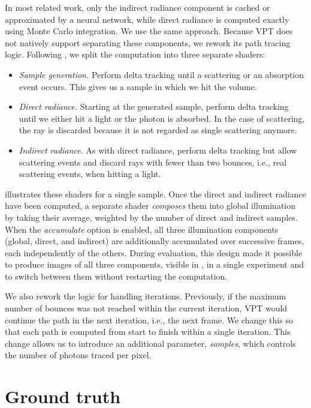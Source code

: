 In most related work, only the indirect radiance component is cached or
approximated by a neural network, while direct radiance is computed exactly using
Monte Carlo integration. We use the same approach. Because VPT does not natively 
support separating these components, we rework its path tracing logic. Following
\cite{bauer_photon_2024}, we split the computation into three separate shaders:
\begin{itemize}
    \item \emph{Sample generation.} Perform delta tracking until a scattering
    or an absorption event occurs. This gives us a sample in which we hit
    the volume.
    \item \emph{Direct radiance.} Starting at the generated sample, perform
    delta tracking until we either hit a light or the photon is absorbed. In
    the case of scattering, the ray is discarded because it is not regarded as
    single scattering anymore.
    \item \emph{Indirect radiance.} As with direct radiance, perform delta
    tracking but allow scattering events and discard rays with fewer than two
    bounces, i.e., real scattering events, when hitting a light.
\end{itemize}
 illustrates these shaders for a single sample. Once the
direct and indirect radiance have been computed, a separate shader \emph{composes}
them into global illumination by taking their average, weighted by the number of 
direct and indirect samples. When the \emph{accumulate} option is enabled, all
three illumination components (global, direct, and indirect) are additionally
accumulated over successive frames, each independently of the others. During evaluation, this design made it possible to produce images of all three
components, visible in , in a single experiment and to 
switch between them without restarting the computation.

We also rework the logic for handling iterations. Previously, if the maximum
number of bounces was not reached within the current iteration, VPT would
continue the path in the next iteration, i.e., the next frame. We change this
so that each path is computed from start to finish within a single iteration.
This change allows us to introduce an additional parameter, \emph{samples},
which controls the number of photons traced per pixel.

\section{Ground truth}

